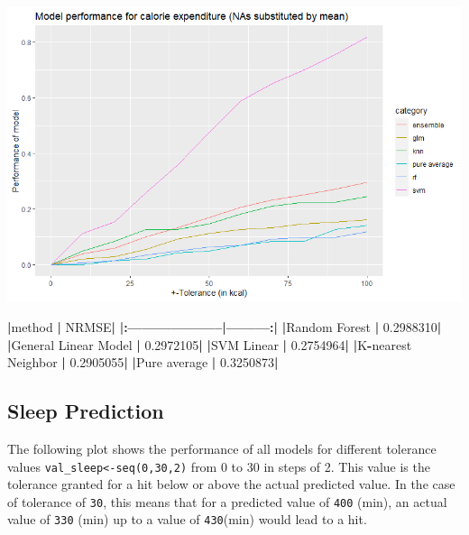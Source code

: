 \documentclass[
]{article}
\newenvironment{Shaded}{\begin{snugshade}}{\end{snugshade}}
\newcommand{\ErrorTok}[1]{\textcolor[rgb]{0.64,0.00,0.00}{\textbf{#1}}}
\newcommand{\FloatTok}[1]{\textcolor[rgb]{0.00,0.00,0.81}{#1}}
\newcommand{\NormalTok}[1]{#1}
\newcommand{\OperatorTok}[1]{\textcolor[rgb]{0.81,0.36,0.00}{\textbf{#1}}}
\newcommand{\StringTok}[1]{\textcolor[rgb]{0.31,0.60,0.02}{#1}}
\begin{document}
\includegraphics{./e26ac17ff62822ef527b8273128e2aae88d54615.png}

\begin{Shaded}
\begin{Highlighting}[]
\OperatorTok{|}\NormalTok{method               }\OperatorTok{|}\StringTok{     }\NormalTok{NRMSE}\OperatorTok{|}
\ErrorTok{|:}\OperatorTok{--------------------}\ErrorTok{|}\OperatorTok{---------}\ErrorTok{:|}
\ErrorTok{|}\NormalTok{Random Forest        }\OperatorTok{|}\StringTok{ }\FloatTok{0.2988310}\OperatorTok{|}
\ErrorTok{|}\NormalTok{General Linear Model }\OperatorTok{|}\StringTok{ }\FloatTok{0.2972105}\OperatorTok{|}
\ErrorTok{|}\NormalTok{SVM Linear           }\OperatorTok{|}\StringTok{ }\FloatTok{0.2754964}\OperatorTok{|}
\ErrorTok{|}\NormalTok{K}\OperatorTok{-}\NormalTok{nearest Neighbor   }\OperatorTok{|}\StringTok{ }\FloatTok{0.2905055}\OperatorTok{|}
\ErrorTok{|}\NormalTok{Pure average         }\OperatorTok{|}\StringTok{ }\FloatTok{0.3250873}\OperatorTok{|}
\end{Highlighting}
\end{Shaded}

\hypertarget{sleep-prediction-1}{%
\subsection{Sleep Prediction}\label{sleep-prediction-1}}

The following plot shows the performance of all models for different
tolerance values \texttt{val\_sleep\textless{}-seq(0,30,2)} from 0 to 30
in steps of 2. This value is the tolerance granted for a hit below or
above the actual predicted value. In the case of tolerance of
\texttt{30}, this means that for a predicted value of \texttt{400}
(min), an actual value of \texttt{330} (min) up to a value of
\texttt{430}(min) would lead to a hit.
\end{document}
